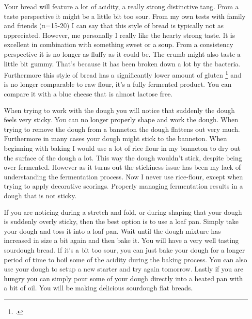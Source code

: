 Your bread will feature a lot of acidity, a really strong distinctive tang. From
a taste perspective it might be a little bit too sour. From my own tests with family and
friends (n=15-20) I can say that this style of bread is typically
not as appreciated. However, me personally I really like the hearty strong taste.
It is excellent in combination with something
sweet or a soup.  From a consistency perspective it is no longer as fluffy as it could be.
The crumb might also taste a little bit gummy. That's because it has been broken down a lot
by the bacteria. Furthermore this style of bread has a significantly lower amount of gluten \footcite{raffaella+di+cagno}
and is no longer comparable to raw flour, it's a fully fermented product.
You can compare it with a blue cheese that is almost lactose free.

When trying to work with the dough you will notice that suddenly the dough feels
very sticky. You can no longer properly shape and work the dough. When trying to
remove the dough from a banneton the dough flattens out very much. Furthermore
in many cases your dough might stick to the banneton. When beginning with baking
I would use a lot of rice flour in my banneton to dry out the surface of the dough a lot.
This way the dough wouldn't stick, despite being over fermented. However as it
turns out the stickiness issue has been my lack of understanding the fermentation
process. Now I never use rice-flour, except when trying to apply decorative scorings.
Properly managing fermentation results in a dough that is not sticky.

If you are noticing during a stretch and fold, or during shaping that your dough
is suddenly overly sticky, then the best option is to use a loaf pan. Simply take
your dough and toss it into a loaf pan. Wait until the dough mixture has increased
in size a bit again and then bake it. You will have a very well tasting sourdough
bread. If it's a bit too sour, you can just bake your dough for a longer period
of time to boil some of the acidity during the baking process. You can also use
your dough to setup a new starter and try again tomorrow. Lastly if you are hungry
you can simply pour some of your dough directly into a heated pan with a bit of
oil. You will be making delicious sourdough flat breads.

